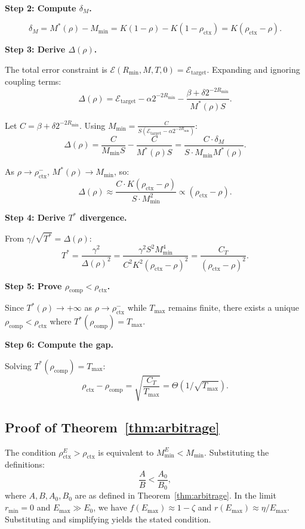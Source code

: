 \documentclass[11pt,a4paper]{article}
\theoremstyle{plain}
\theoremstyle{definition}
\begin{document}
\textbf{Step 2: Compute $\delta_M$.}

\[
\delta_M = M^*(\rho) - M_{\min} = K(1-\rho) - K(1-\rho_{\text{ctx}}) = K(\rho_{\text{ctx}} - \rho).
\]

\textbf{Step 3: Derive $\Delta(\rho)$.}

The total error constraint is $\mathcal{E}(R_{\min}, M, T, 0) = \mathcal{E}_{\text{target}}$. Expanding and ignoring coupling terms:
\[
\Delta(\rho) = \mathcal{E}_{\text{target}} - \alpha 2^{-2R_{\min}} - \frac{\beta + \delta 2^{-2R_{\min}}}{M^*(\rho)S}.
\]

Let $C = \beta + \delta 2^{-2R_{\min}}$. Using $M_{\min} = \frac{C}{S(\mathcal{E}_{\text{target}} - \alpha 2^{-2R_{\min}})}$:
\[
\Delta(\rho) = \frac{C}{M_{\min}S} - \frac{C}{M^*(\rho)S} = \frac{C \cdot \delta_M}{S \cdot M_{\min} M^*(\rho)}.
\]

As $\rho \to \rho_{\text{ctx}}^-$, $M^*(\rho) \to M_{\min}$, so:
\[
\Delta(\rho) \approx \frac{C \cdot K (\rho_{\text{ctx}} - \rho)}{S \cdot M_{\min}^2} \propto (\rho_{\text{ctx}} - \rho).
\]

\textbf{Step 4: Derive $T^*$ divergence.}

From $\gamma/\sqrt{T^*} = \Delta(\rho)$:
\[
T^* = \frac{\gamma^2}{\Delta(\rho)^2} = \frac{\gamma^2 S^2 M_{\min}^4}{C^2 K^2 (\rho_{\text{ctx}} - \rho)^2} = \frac{C_T}{(\rho_{\text{ctx}} - \rho)^2}.
\]

\textbf{Step 5: Prove $\rho_{\text{comp}} < \rho_{\text{ctx}}$.}

Since $T^*(\rho) \to +\infty$ as $\rho \to \rho_{\text{ctx}}^-$ while $T_{\max}$ remains finite, there exists a unique $\rho_{\text{comp}} < \rho_{\text{ctx}}$ where $T^*(\rho_{\text{comp}}) = T_{\max}$.

\textbf{Step 6: Compute the gap.}

Solving $T^*(\rho_{\text{comp}}) = T_{\max}$:
\[
\rho_{\text{ctx}} - \rho_{\text{comp}} = \sqrt{\frac{C_T}{T_{\max}}} = \Theta(1/\sqrt{T_{\max}}).
\]

\subsection{Proof of Theorem~\ref{thm:arbitrage}}
\label{app:proof_arbitrage}

The condition $\rho_{\text{ctx}}^E > \rho_{\text{ctx}}$ is equivalent to $M_{\min}^E < M_{\min}$. Substituting the definitions:
\[
\frac{A}{B} < \frac{A_0}{B_0},
\]
where $A, B, A_0, B_0$ are as defined in Theorem~\ref{thm:arbitrage}. In the limit $r_{\min} = 0$ and $E_{\max} \gg E_0$, we have $f(E_{\max}) \approx 1-\zeta$ and $r(E_{\max}) \approx \eta/E_{\max}$. Substituting and simplifying yields the stated condition.
\end{document}

